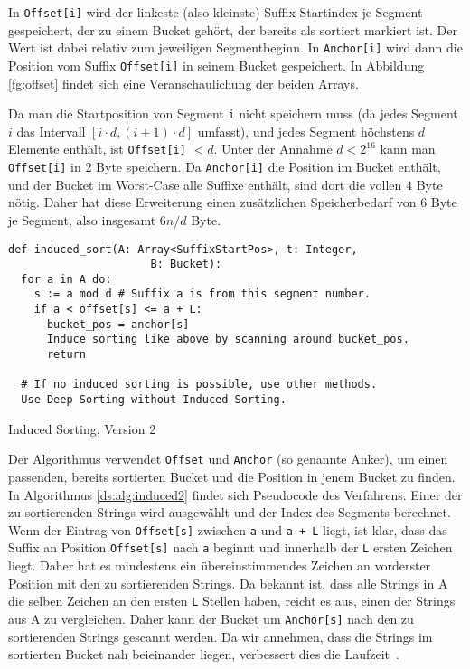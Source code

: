 In \texttt{Offset[i]} wird der linkeste (also kleinste) Suffix-Startindex je Segment gespeichert,
der zu einem Bucket gehört, der bereits als sortiert markiert ist.
Der Wert ist dabei relativ zum jeweiligen Segmentbeginn.
In \texttt{Anchor[i]} wird dann die Position vom Suffix \texttt{Offset[i]} in seinem Bucket gespeichert.
In Abbildung \ref{fg:offset} findet sich eine Veranschaulichung der beiden Arrays.

Da man die Startposition von Segment \texttt{i} nicht speichern muss (da jedes Segment $i$ das Intervall $[i\cdot d, (i + 1) \cdot d]$ umfasst), und jedes Segment höchstens $d$ Elemente enthält, ist \texttt{Offset[i]} $< d$.
Unter der Annahme $d < 2^{16}$ kann man \texttt{Offset[i]} in 2 Byte speichern.
Da \texttt{Anchor[i]} die Position im Bucket enthält, und der Bucket im Worst-Case alle Suffixe enthält, sind dort die vollen $4$ Byte nötig.
Daher hat diese Erweiterung einen zusätzlichen Speicherbedarf von $6$ Byte je Segment, also insgesamt $6n/d$ Byte.

\begin{listing}
\begin{verbatim}
def induced_sort(A: Array<SuffixStartPos>, t: Integer,
                      B: Bucket):
  for a in A do:
    s := a mod d # Suffix a is from this segment number.
    if a < offset[s] <= a + L:
      bucket_pos = anchor[s]
      Induce sorting like above by scanning around bucket_pos.
      return

  # If no induced sorting is possible, use other methods.
  Use Deep Sorting without Induced Sorting.
\end{verbatim}
\caption{Induced Sorting, Version 2~\cite{saca:4}}
\label{ds:alg:induced2}
\end{listing}

Der Algorithmus verwendet \texttt{Offset} und \texttt{Anchor} (so genannte Anker), um einen passenden, bereits sortierten Bucket und die Position in jenem Bucket zu finden.
In Algorithmus \ref{ds:alg:induced2} findet sich Pseudocode des Verfahrens.
Einer der zu sortierenden Strings wird ausgewählt und der Index des Segments berechnet.
Wenn der Eintrag von \texttt{Offset[s]} zwischen \texttt{a} und \texttt{a + L} liegt, ist klar, dass das Suffix an Position \texttt{Offset[s]} nach \texttt{a} beginnt und innerhalb der \texttt L ersten Zeichen liegt.
Daher hat es mindestens ein übereinstimmendes Zeichen an vorderster Position mit den zu sortierenden Strings.
Da bekannt ist, dass alle Strings in A die selben Zeichen an den ersten \texttt{L} Stellen haben, reicht es aus, einen der Strings aus A zu vergleichen.
Daher kann der Bucket um \texttt{Anchor[s]} nach den zu sortierenden Strings gescannt werden.
Da wir annehmen, dass die Strings im sortierten Bucket nah beieinander liegen, verbessert dies die Laufzeit~\cite{saca:4}.

